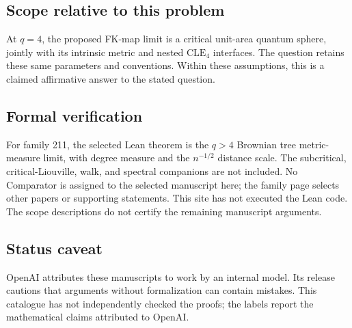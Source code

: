 \documentclass[11pt]{article}
\begin{document}
\subsection{Scope relative to this problem}
At $q=4$, the proposed FK-map limit is a critical unit-area quantum sphere, jointly with its intrinsic metric and nested $\mathrm{CLE}_4$ interfaces. The question retains these same parameters and conventions. Within these assumptions, this is a claimed affirmative answer to the stated question.

\subsection{Formal verification}
For family 211, the selected Lean theorem is the $q>4$ Brownian tree metric-measure limit, with degree measure and the $n^{-1/2}$ distance scale. The subcritical, critical-Liouville, walk, and spectral companions are not included. No Comparator is assigned to the selected manuscript here; the family page selects other papers or supporting statements. This site has not executed the Lean code. The scope descriptions do not certify the remaining manuscript arguments.

\subsection{Status caveat}
OpenAI attributes these manuscripts to work by an internal model. Its release cautions that arguments without formalization can contain mistakes. This catalogue has not independently checked the proofs; the labels report the mathematical claims attributed to OpenAI.
\end{document}
